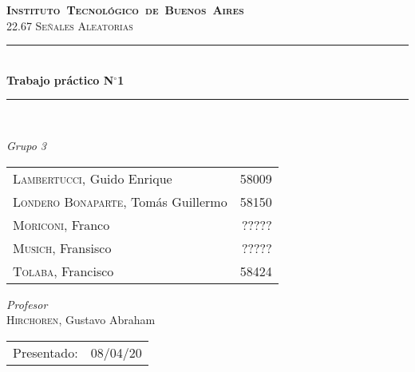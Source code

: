 \begin{titlepage}
\newcommand{\HRule}{\rule{\linewidth}{0.5mm}}
\center
\mbox{\textsc{\LARGE \bfseries {Instituto Tecnológico de Buenos Aires}}}\\[1.5cm]
\textsc{\Large 22.67 Señales Aleatorias}\\[0.5cm]


\HRule \\[0.6cm]
{ \Huge \bfseries Trabajo práctico N$^{\circ}$1}\\[0.4cm] 
\HRule \\[1.5cm]


{\large

\emph{Grupo 3}\\
\vspace{3px}

\begin{tabular}{lr} 	
\textsc{Lambertucci}, Guido Enrique  & 58009 \\
\textsc{Londero Bonaparte}, Tomás Guillermo  & 58150 \\
\textsc{Moriconi}, Franco  &  ?????\\
\textsc{Musich}, Fransisco  & ?????\\
\textsc{Tolaba}, Francisco  & 58424\\
\end{tabular}

\vspace{20px}

\emph{Profesor}\\
\textsc{Hirchoren}, Gustavo Abraham \\
\vspace{3px}

\vspace{100px}

\begin{tabular}{ll}

Presentado: & 08/04/20\\

\end{tabular}

}

\vfill

\end{titlepage}
